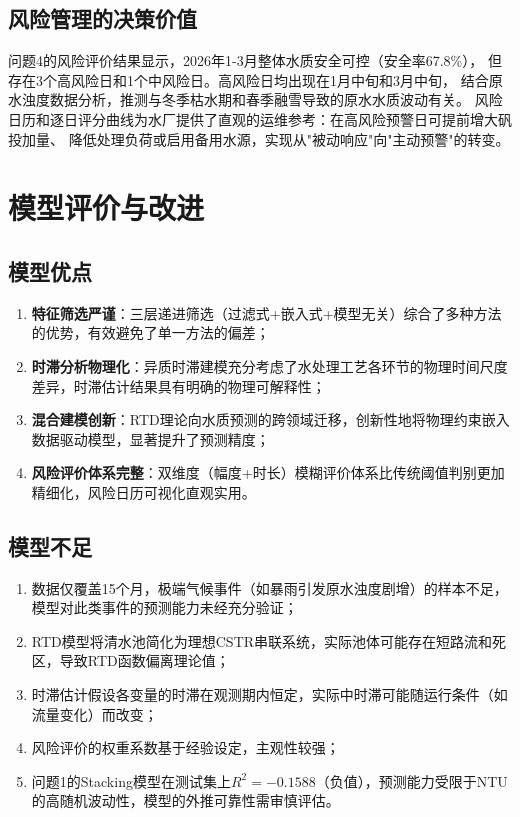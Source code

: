 \documentclass[12pt,a4paper]{ctexart}
\begin{document}
\subsection{风险管理的决策价值}

问题4的风险评价结果显示，2026年1-3月整体水质安全可控（安全率67.8\%），
但存在3个高风险日和1个中风险日。高风险日均出现在1月中旬和3月中旬，
结合原水浊度数据分析，推测与冬季枯水期和春季融雪导致的原水水质波动有关。
风险日历和逐日评分曲线为水厂提供了直观的运维参考：在高风险预警日可提前增大矾投加量、
降低处理负荷或启用备用水源，实现从"被动响应"向"主动预警"的转变。

\section{模型评价与改进}

\subsection{模型优点}

\begin{enumerate}[nosep]
    \item \textbf{特征筛选严谨}：三层递进筛选（过滤式+嵌入式+模型无关）综合了多种方法的优势，有效避免了单一方法的偏差；
    \item \textbf{时滞分析物理化}：异质时滞建模充分考虑了水处理工艺各环节的物理时间尺度差异，时滞估计结果具有明确的物理可解释性；
    \item \textbf{混合建模创新}：RTD理论向水质预测的跨领域迁移，创新性地将物理约束嵌入数据驱动模型，显著提升了预测精度；
    \item \textbf{风险评价体系完整}：双维度（幅度+时长）模糊评价体系比传统阈值判别更加精细化，风险日历可视化直观实用。
\end{enumerate}

\subsection{模型不足}

\begin{enumerate}[nosep]
    \item 数据仅覆盖15个月，极端气候事件（如暴雨引发原水浊度剧增）的样本不足，模型对此类事件的预测能力未经充分验证；
    \item RTD模型将清水池简化为理想CSTR串联系统，实际池体可能存在短路流和死区，导致RTD函数偏离理论值；
    \item 时滞估计假设各变量的时滞在观测期内恒定，实际中时滞可能随运行条件（如流量变化）而改变；
    \item 风险评价的权重系数基于经验设定，主观性较强；
    \item 问题1的Stacking模型在测试集上$R^2=-0.1588$（负值），预测能力受限于NTU的高随机波动性，模型的外推可靠性需审慎评估。
\end{enumerate}
\end{document}
